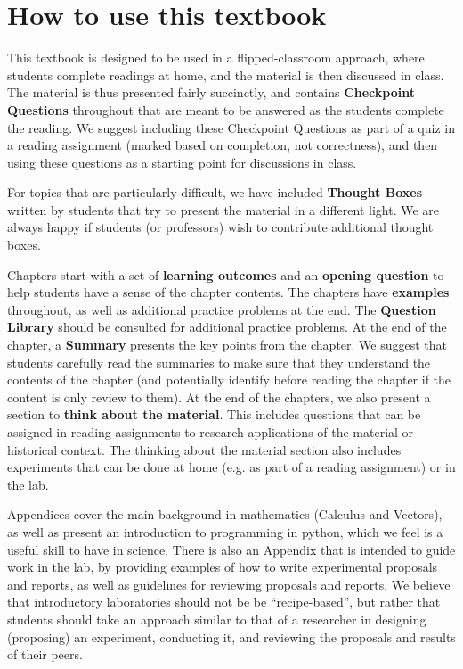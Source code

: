 \section*{How to use this textbook}
This textbook is designed to be used in a flipped-classroom approach, where students complete readings at home, and the material is then discussed in class. The material is thus presented fairly succinctly, and contains \textbf{Checkpoint Questions} throughout that are meant to be answered as the students complete the reading. We suggest including these Checkpoint Questions as part of a quiz in a reading assignment (marked based on completion, not correctness), and then using these questions as a starting point for discussions in class. 

For topics that are particularly difficult, we have included \textbf{Thought Boxes} written by students that try to present the material in a different light. We are always happy if students (or professors) wish to contribute additional thought boxes.

Chapters start with a set of \textbf{learning outcomes} and an \textbf{opening question} to help students have a sense of the chapter contents. The chapters have \textbf{examples} throughout, as well as additional practice problems at the end. The \textbf{Question Library} should be consulted for additional practice problems. At the end of the chapter, a \textbf{Summary} presents the key points from the chapter. We suggest that students carefully read the summaries to make sure that they understand the contents of the chapter (and potentially identify before reading the chapter if the content is only review to them). At the end of the chapters, we also present a section to \textbf{think about the material}. This includes questions that can be assigned in reading assignments to research applications of the material or historical context. The thinking about the material section also includes experiments that can be done at home (e.g. as part of a reading assignment) or in the lab. 

Appendices cover the main background in mathematics (Calculus and Vectors), as well as present an introduction to programming in python, which we feel is a useful skill to have in science. There is also an Appendix that is intended to guide work in the lab, by providing examples of how to write experimental proposals and reports, as well as guidelines for reviewing proposals and reports. We believe that introductory laboratories should not be be ``recipe-based'', but rather that students should take an approach similar to that of a researcher in designing (proposing) an experiment, conducting it, and reviewing the proposals and results of their peers.

